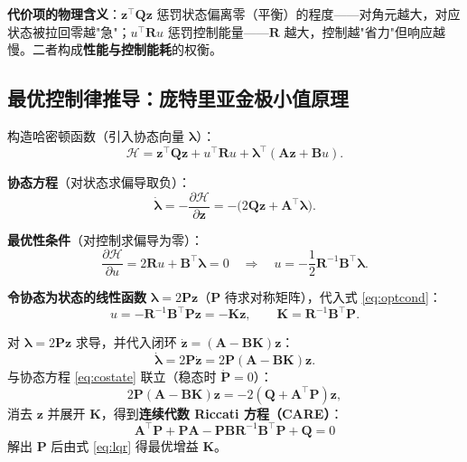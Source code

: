 \documentclass[11pt,a4paper]{article}
\begin{document}
\textbf{代价项的物理含义}：$\mathbf z^{\top}\mathbf Q\mathbf z$ 惩罚状态偏离零（平衡）的程度——对角元越大，对应状态被拉回零越"急"；$u^{\top}\mathbf R u$ 惩罚控制能量——$\mathbf R$ 越大，控制越"省力"但响应越慢。二者构成\textbf{性能与控制能耗}的权衡。

\subsection{最优控制律推导：庞特里亚金极小值原理}

构造哈密顿函数（引入协态向量 $\bm\lambda$）：
\begin{equation}
    \mathcal H = \mathbf z^{\top}\mathbf Q\mathbf z + u^{\top}\mathbf R u + \bm\lambda^{\top}(\mathbf A\mathbf z + \mathbf B u) .
\end{equation}

\textbf{协态方程}（对状态求偏导取负）：
\begin{equation}
    \dot{\bm\lambda} = -\frac{\partial \mathcal H}{\partial \mathbf z} = -\big(2\mathbf Q\mathbf z + \mathbf A^{\top}\bm\lambda\big) .
    \label{eq:costate}
\end{equation}

\textbf{最优性条件}（对控制求偏导为零）：
\begin{equation}
    \frac{\partial \mathcal H}{\partial u} = 2\mathbf R u + \mathbf B^{\top}\bm\lambda = 0
    \quad\Longrightarrow\quad
    u = -\frac{1}{2}\mathbf R^{-1}\mathbf B^{\top}\bm\lambda .
    \label{eq:optcond}
\end{equation}

\textbf{令协态为状态的线性函数} $\bm\lambda = 2\mathbf P\mathbf z$（$\mathbf P$ 待求对称矩阵），代入式 \eqref{eq:optcond}：
\begin{equation}
    u = -\mathbf R^{-1}\mathbf B^{\top}\mathbf P \mathbf z = -\mathbf K \mathbf z,
    \qquad \mathbf K = \mathbf R^{-1}\mathbf B^{\top}\mathbf P .
    \label{eq:lqr}
\end{equation}

对 $\bm\lambda = 2\mathbf P\mathbf z$ 求导，并代入闭环 $\dot{\mathbf z} = (\mathbf A - \mathbf B\mathbf K)\mathbf z$：
\begin{equation}
    \dot{\bm\lambda} = 2\mathbf P\dot{\mathbf z} = 2\mathbf P(\mathbf A - \mathbf B\mathbf K)\mathbf z .
\end{equation}
与协态方程 \eqref{eq:costate} 联立（稳态时 $\dot{\mathbf P} = 0$）：
\begin{equation}
    2\mathbf P(\mathbf A - \mathbf B\mathbf K)\mathbf z = -2(\mathbf Q + \mathbf A^{\top}\mathbf P)\mathbf z ,
\end{equation}
消去 $\mathbf z$ 并展开 $\mathbf K$，得到\textbf{连续代数 Riccati 方程（CARE）}：
\begin{equation}
\boxed{\;
    \mathbf A^{\top}\mathbf P + \mathbf P\mathbf A - \mathbf P\mathbf B\mathbf R^{-1}\mathbf B^{\top}\mathbf P + \mathbf Q = 0
\;}
\label{eq:care}
\end{equation}
解出 $\mathbf P$ 后由式 \eqref{eq:lqr} 得最优增益 $\mathbf K$。
\end{document}
